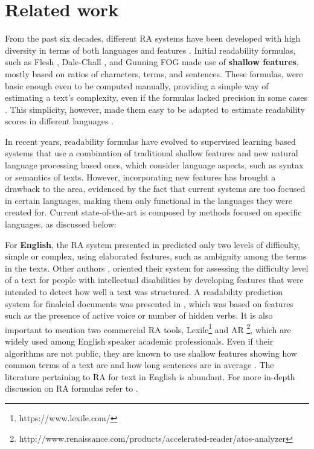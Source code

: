 \documentclass{bsu-ms}
\begin{document}
\chapter{Related work}


From the past six decades, different RA systems have been developed with high diversity in terms of both languages and features \cite{feng2010comparison,benjamin2012reconstructing}. Initial readability formulas, such as Flesh \cite{flesch1948new}, Dale-Chall \cite{chall1995readability}, and Gunning FOG \cite{albright1996readability} made use of \textbf{shallow features}, mostly based on ratios of characters, terms, and sentences. These formulas, were basic enough even to be computed manually, providing a simple way of estimating a text's complexity, even if the formulas lacked precision in some cases \cite{davison1982failure}. This simplicity, however, made them easy to be adapted to estimate readability scores in different languages \cite{spaulding1956spanish}.

In recent years, readability formulas have evolved to supervised learning based systems that use a combination of traditional shallow features and new natural language processing based ones, which consider language aspects, such as syntax or semantics of texts. However, incorporating  new features has brought a drawback to the area, evidenced by the fact that current systems are too focused in certain languages, making them only functional in the languages they were created for. Current state-of-the-art is composed by methods focused on specific languages, as discussed below:


For \textbf{English}, 
the RA system presented in \cite{aluisio2010readability} predicted only two levels of difficulty, simple or complex, using elaborated features, such as ambiguity among the terms in the texts. Other authors \cite{textsimplificationWithDisabilities1}, oriented their system for assessing the difficulty level of a text for people with intellectual disabilities by developing features that were intended to detect how well a text was structured. A readability prediction system for  finalcial documents was presented in \cite{bonsall2015plain}, which was based on features such as the presence of active voice or number of hidden verbs. It is also important to mention two commercial RA tools, Lexile\footnote{https://www.lexile.com/} and AR \footnote{http://www.renaissance.com/products/accelerated-reader/atos-analyzer}, which are widely used among English speaker academic professionals. Even if their algorithms are not public, they are known to use shallow features showing how common terms of a text are and how long sentences are in average \cite{lennon2004lexile}. The literature pertaining to RA for text in English is abundant. For more in-depth discussion on RA formulas refer to \cite{feng2010comparison,benjamin2012reconstructing}.
\end{document}

